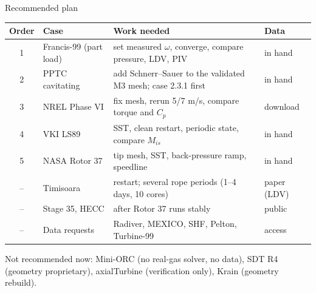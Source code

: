 \documentclass[aspectratio=169,10pt]{beamer}
\begin{document}
\begin{frame}{Recommended plan}
\small
\begin{tabularx}{\textwidth}{@{}c l X l@{}}\toprule
Order & Case & Work needed & Data\\\midrule
1 & Francis-99 (part load) & set measured $\omega$, converge, compare pressure, LDV, PIV & in hand\\
2 & PPTC cavitating & add Schnerr--Sauer to the validated M3 mesh; case 2.3.1 first & in hand\\
3 & NREL Phase VI & fix mesh, rerun 5/7 m/s, compare torque and $C_p$ & download\\
4 & VKI LS89 & SST, clean restart, periodic state, compare $M_{is}$ & in hand\\
5 & NASA Rotor 37 & tip mesh, SST, back-pressure ramp, speedline & in hand\\\midrule
-- & Timisoara & restart; several rope periods (1--4 days, 10 cores) & paper (LDV)\\
-- & Stage 35, HECC & after Rotor 37 runs stably & public\\
-- & Data requests & Radiver, MEXICO, SHF, Pelton, Turbine-99 & access\\\bottomrule
\end{tabularx}
\vspace{2mm}
\footnotesize Not recommended now: Mini-ORC (no real-gas solver, no data), SDT R4 (geometry proprietary), axialTurbine (verification only), Krain (geometry rebuild).
\end{frame}
\end{document}

